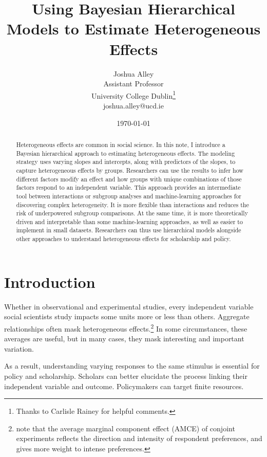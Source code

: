 \documentclass[12pt]{article}
\title{\textbf{Using Bayesian Hierarchical Models to Estimate Heterogeneous Effects}}
\author{Joshua Alley \\
Assistant Professor \\
University College Dublin\thanks{Thanks to Carlisle Rainey for helpful comments.} \\
joshua.alley@ucd.ie
}
\date{\today}
\begin{document}
\maketitle 

\begin{abstract} 
Heterogeneous effects are common in social science. 
In this note, I introduce a Bayesian hierarchical approach to estimating heterogeneous effects. 
The modeling strategy uses varying slopes and intercepts, along with predictors of the slopes, to capture heterogeneous effects by groups.  
Researchers can use the results to infer how different factors modify an effect and how groups with unique combinations of those factors respond to an independent variable. 
This approach provides an intermediate tool between interactions or subgroup analyses and machine-learning approaches for discovering complex heterogeneity. 
It is more flexible than interactions and reduces the risk of underpowered subgroup comparisons.
At the same time, it is more theoretically driven and interpretable than some machine-learning approaches, as well as easier to implement in small datasets. 
Researchers can thus use hierarchical models alongside other approaches to understand heterogeneous effects for scholarship and policy.
\end{abstract} 


\newpage 
\doublespace 


\section{Introduction}


Whether in observational and experimental studies, every independent variable social scientists study impacts some units more or less than others. 
Aggregate relationships often mask heterogeneous effects.\footnote{\citet{Abramsonetal2022} note that the average marginal component effect (AMCE) of conjoint experiments reflects the direction and intensity of respondent preferences, and gives more weight to intense preferences.} 
In some circumstances, these averages are useful, but in many cases, they mask interesting and important variation. 


As a result, understanding varying responses to the same stimulus is essential for policy and scholarship. 
Scholars can better elucidate the process linking their independent variable and outcome.
Policymakers can target finite resources. 


\end{document}

